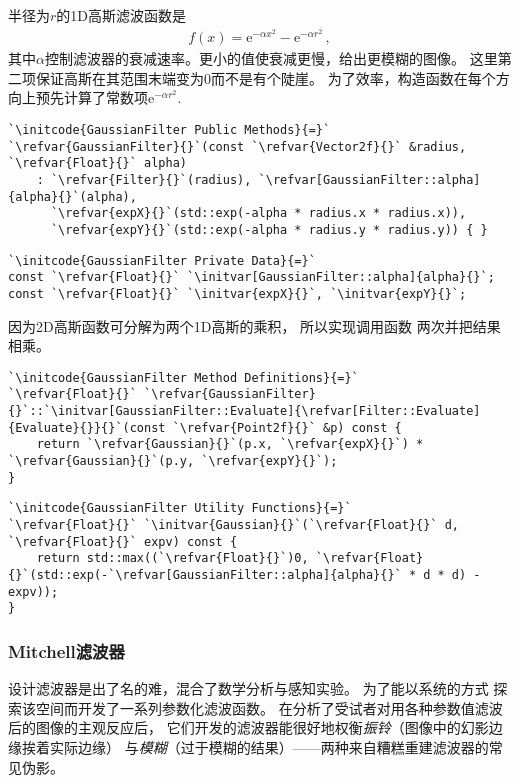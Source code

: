 半径为$r$的1D高斯滤波函数是
\begin{align*}
    f(x)={\mathrm{e}}^{-\alpha x^2}-{\mathrm{e}}^{-\alpha r^2}\, ,
\end{align*}
其中$\alpha$控制滤波器的衰减速率。更小的值使衰减更慢，给出更模糊的图像。
这里第二项保证高斯在其范围末端变为0而不是有个陡崖。
为了效率，构造函数在每个方向上预先计算了常数项${\mathrm{e}}^{-\alpha r^2}$.
\begin{lstlisting}
`\initcode{GaussianFilter Public Methods}{=}`
`\refvar{GaussianFilter}{}`(const `\refvar{Vector2f}{}` &radius, `\refvar{Float}{}` alpha)
    : `\refvar{Filter}{}`(radius), `\refvar[GaussianFilter::alpha]{alpha}{}`(alpha),
      `\refvar{expX}{}`(std::exp(-alpha * radius.x * radius.x)),
      `\refvar{expY}{}`(std::exp(-alpha * radius.y * radius.y)) { }
\end{lstlisting}
\begin{lstlisting}
`\initcode{GaussianFilter Private Data}{=}`
const `\refvar{Float}{}` `\initvar[GaussianFilter::alpha]{alpha}{}`;
const `\refvar{Float}{}` `\initvar{expX}{}`, `\initvar{expY}{}`;
\end{lstlisting}

因为2D高斯函数可分解为两个1D高斯的乘积，
所以实现调用函数
两次并把结果相乘。
\begin{lstlisting}
`\initcode{GaussianFilter Method Definitions}{=}`
`\refvar{Float}{}` `\refvar{GaussianFilter}{}`::`\initvar[GaussianFilter::Evaluate]{\refvar[Filter::Evaluate]{Evaluate}{}}{}`(const `\refvar{Point2f}{}` &p) const {
    return `\refvar{Gaussian}{}`(p.x, `\refvar{expX}{}`) * `\refvar{Gaussian}{}`(p.y, `\refvar{expY}{}`);
}
\end{lstlisting}
\begin{lstlisting}
`\initcode{GaussianFilter Utility Functions}{=}`
`\refvar{Float}{}` `\initvar{Gaussian}{}`(`\refvar{Float}{}` d, `\refvar{Float}{}` expv) const {
    return std::max((`\refvar{Float}{}`)0, `\refvar{Float}{}`(std::exp(-`\refvar[GaussianFilter::alpha]{alpha}{}` * d * d) - expv));
}
\end{lstlisting}

\subsubsection*{Mitchell滤波器}
设计滤波器是出了名的难，混合了数学分析与感知实验。
\citet{10.1145/54852.378514}为了能以系统的方式
探索该空间而开发了一系列参数化滤波函数。
在分析了受试者对用各种参数值滤波后的图像的主观反应后，
它们开发的滤波器能很好地权衡\emph{振铃}（图像中的幻影边缘挨着实际边缘）
与\emph{模糊}（过于模糊的结果）——两种来自糟糕重建滤波器的常见伪影。

